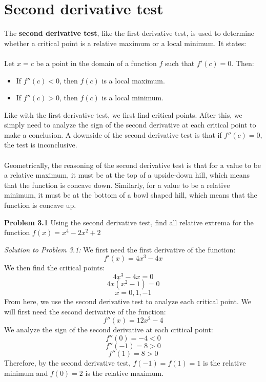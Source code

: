 \documentclass[11pt]{scrartcl}
\begin{document}
\section{Second derivative test}
\noindent 
The \textbf{second derivative test}, like the first derivative test, is used to determine whether a critical point is a relative maximum or a local minimum. It states: \\
\\
\noindent 
Let $x=c$ be a point in the domain of a function $f$ such that $f'(c)=0$. Then: 
\begin{itemize}
    \item If $f''(c)<0$, then $f(c)$ is a local maximum.
    \item If $f''(c)>0$, then $f(c)$ is a local minimum. 
\end{itemize}
\noindent 
Like with the first derivative test, we first find critical points. After this, we simply need to analyze the sign of the second derivative at each critical point to make a conclusion. A downside of the second derivative test is that if $f''(c)=0$, the test is inconclusive.\\
\\
\noindent 
Geometrically, the reasoning of the second derivative test is that for a value to be a relative maximum, it must be at the top of a upside-down hill, which means that the function is concave down. Similarly, for a value to be a relative minimum, it must be at the bottom of a bowl shaped hill, which means that the function is concave up. 
\begin{tcolorbox}
[colback=purple!5!white,colframe=purple!75!black]
\textbf{Problem 3.1} Using the second derivative test, find all relative extrema for the function $f(x)=x^4-2x^2+2$
\end{tcolorbox}
\noindent 
\textit{Solution to Problem 3.1:} We first need the first derivative of the function: 
$$f'(x)=4x^3-4x$$
\noindent 
We then find the critical points: 
$$4x^3-4x=0$$
$$4x(x^2-1)=0$$
$$x=0,1,-1$$
\noindent 
From here, we use the second derivative test to analyze each critical point. We will first need the second derivative of the function: 
$$f''(x)=12x^2-4$$
\noindent 
We analyze the sign of the second derivative at each critical point: 
$$f''(0)=-4<0$$
$$f''(-1)=8>0$$
$$f''(1)=8>0$$
Therefore, by the second derivative test, $f(-1)=f(1)=1$ is the relative minimum and $f(0)=2$ is the relative maximum.
\end{document}
